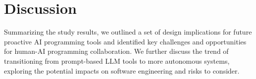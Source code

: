 \section{Discussion}




Summarizing the study results, we outlined a set of design implications for future proactive AI programming tools and identified key challenges and opportunities for human-AI programming collaboration.
We further discuss the trend of transitioning from prompt-based LLM tools to more autonomous systems, exploring the potential impacts on software engineering and risks to consider.

